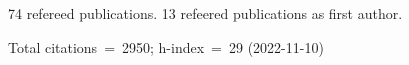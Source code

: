 74 refereed publications. 13 refeered publications as first author.

Total citations~=~2950; h-index~=~29 (2022-11-10)